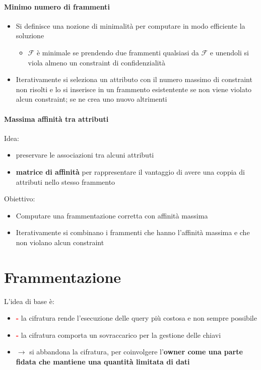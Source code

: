 \documentclass{report}
\begin{document}
\subsubsection{Minimo numero di frammenti}
\begin{itemize}
    \item Si definisce una nozione di minimalità per computare in modo efficiente la soluzione
    \begin{itemize}
        \item $\mathcal{F}$ è minimale se prendendo due frammenti qualsiasi da $\mathcal{F}$ e unendoli si viola almeno un constraint di confidenzialità
    \end{itemize}
    \item Iterativamente si seleziona un attributo con il numero massimo di constraint non risolti e lo si inserisce 
    in un frammento esistentente se non viene violato alcun constraint; se ne crea uno nuovo altrimenti
\end{itemize}

\subsubsection{Massima affinità tra attributi}
Idea:
\begin{itemize}
    \item preservare le associazioni tra alcuni attributi 
    \item \textbf{matrice di affinità} per rappresentare il vantaggio di avere una coppia 
    di attributi nello stesso frammento
\end{itemize}

Obiettivo: 
\begin{itemize}
    \item Computare una frammentazione corretta con affinità massima 
    \item Iterativamente si combinano i frammenti che hanno l'affinità massima e che non violano alcun constraint
\end{itemize}

\chapter{Frammentazione}
L'idea di base è:
\begin{itemize}
    \item \textcolor{red}{\textbf{-}} la cifratura rende l'esecuzione delle query più costosa e non sempre possibile 
    \item \textcolor{red}{\textbf{-}} la cifratura comporta un sovraccarico per la gestione delle chiavi
    \item $\rightarrow$ si abbandona la cifratura, per coinvolgere l'\textbf{owner come una parte fidata che mantiene una quantità limitata di dati}
\end{itemize}
\end{document}
